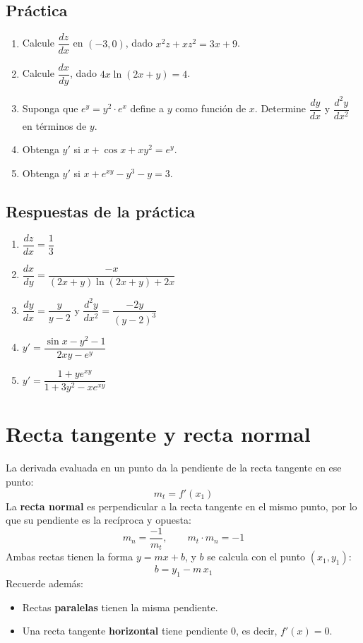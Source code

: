 \documentclass[12pt]{article}
\begin{document}
\subsection{Práctica}
\begin{enumerate}
    \item Calcule $\dfrac{dz}{dx}$ en $(-3, 0)$, dado $x^2 z + x z^2 = 3x + 9$.
    \item Calcule $\dfrac{dx}{dy}$, dado $4x\ln(2x + y) = 4$.
    \item Suponga que $e^y = y^2 \cdot e^x$ define a $y$ como función de $x$. Determine $\dfrac{dy}{dx}$ y $\dfrac{d^2y}{dx^2}$ en términos de $y$.
    \item Obtenga $y'$ si $x + \cos x + xy^2 = e^y$.
    \item Obtenga $y'$ si $x + e^{xy} - y^3 - y = 3$.
\end{enumerate}

\subsection{Respuestas de la práctica}
\begin{enumerate}
    \item $\dfrac{dz}{dx} = \dfrac{1}{3}$
    \item $\dfrac{dx}{dy} = \dfrac{-x}{(2x + y)\ln(2x + y) + 2x}$
    \item $\dfrac{dy}{dx} = \dfrac{y}{y - 2}$ \quad y \quad $\dfrac{d^2y}{dx^2} = \dfrac{-2y}{(y - 2)^3}$
    \item $y' = \dfrac{\sin x - y^2 - 1}{2xy - e^y}$
    \item $y' = \dfrac{1 + y e^{xy}}{1 + 3y^2 - x e^{xy}}$
\end{enumerate}

\section{Recta tangente y recta normal}

La derivada evaluada en un punto da la pendiente de la recta tangente en ese punto:
\[
m_t = f'(x_1)
\]
La \textbf{recta normal} es perpendicular a la recta tangente en el mismo punto, por lo que su pendiente es la recíproca y opuesta:
\[
m_n = \frac{-1}{m_t}, \qquad m_t \cdot m_n = -1
\]
Ambas rectas tienen la forma $y = mx + b$, y $b$ se calcula con el punto $(x_1, y_1)$:
\[
b = y_1 - m\,x_1
\]
Recuerde además:
\begin{itemize}
    \item Rectas \textbf{paralelas} tienen la misma pendiente.
    \item Una recta tangente \textbf{horizontal} tiene pendiente $0$, es decir, $f'(x) = 0$.
\end{itemize}
\end{document}
